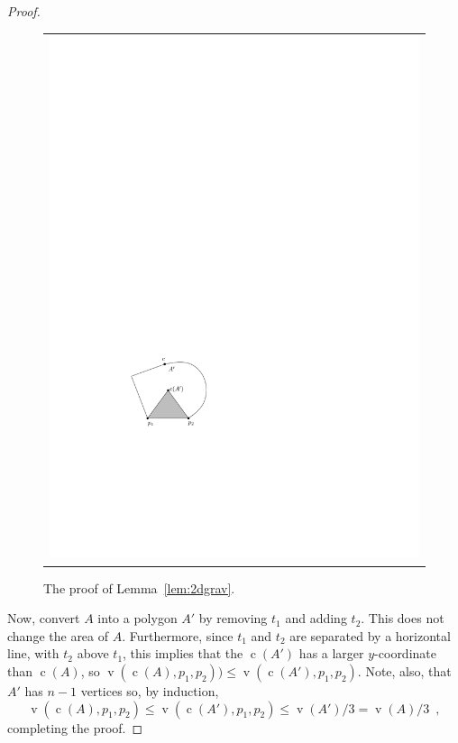 \documentclass[preprint, 12pt]{elsarticle}
\DeclareMathOperator{\vol}{v}
\DeclareMathOperator{\cog}{c}
\begin{document}
\begin{proof}
\begin{figure}[htbp]
\begin{center}
\begin{tabular}{cc}
      \multicolumn{2}{c}{\includegraphics{pics/inductive3}}
    \end{tabular}
  \end{center}
  \caption{The proof of Lemma~\ref{lem:2dgrav}.}
  \label{fig:inductive}
\end{figure}

Now, convert $A$ into a polygon $A'$ by removing $t_1$ and adding $t_2$.
This does not change the area of $A$.  Furthermore, since $t_1$ and
$t_2$ are separated by a horizontal line, with $t_2$ above $t_1$, this
implies that the $\cog(A')$ has a larger $y$-coordinate than $\cog(A)$,
so $\vol(\cog(A),p_1,p_2)) \le \vol(\cog(A'),p_1,p_2)$.  Note, also, that $A'$
has $n-1$ vertices so, by induction,
\[
  \vol(\cog(A),p_1,p_2) \le \vol(\cog(A'),p_1,p_2) \le \vol(A')/3 = \vol(A)/3 \enspace ,
\]
completing the proof.
\end{proof}
\end{document}

